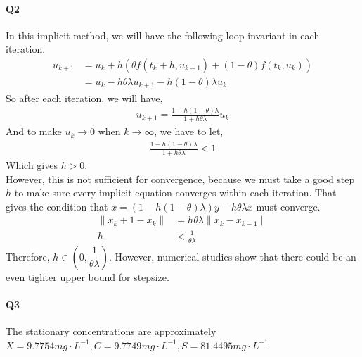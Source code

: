 \documentclass[11pt]{article}
\begin{document}
\paragraph{Q2}
In this implicit method, we will have the following loop invariant in each iteration.
\begin{align}
	u_{k+1}&=u_k+h(\theta f(t_k+h,u_{k+1})+(1-\theta)f(t_k,u_k))\\
	&=u_k-h\theta\lambda u_{k+1}-h(1-\theta)\lambda u_k
\end{align}
So after each iteration, we will have,
\begin{align}
	u_{k+1}=\frac{1-h(1-\theta)\lambda}{1+h\theta\lambda}u_k
\end{align}
And to make $u_k\rightarrow0$ when $k\rightarrow\infty$, we have to let,
\begin{align}
	\frac{1-h(1-\theta)\lambda}{1+h\theta\lambda}<1
\end{align}
Which gives $h>0$.\\
However, this is not sufficient for convergence, because we must take a good step $h$ to make sure every implicit equation converges within each iteration. That gives the condition that $x=(1-h(1-\theta)\lambda)y-h\theta\lambda x$ must converge.
\begin{align}
	\|x_k+1-x_k\|&=h\theta\lambda\|x_k-x_{k-1}\|\\
	h&<\frac{1}{\theta\lambda}
\end{align} 
Therefore, $h\in (0,\dfrac{1}{\theta\lambda})$. However, numerical studies show that there could be an even tighter upper bound for stepsize.
\paragraph{Q3}
The stationary concentrations are approximately $X=9.7754mg\cdot L^{-1}, C=9.7749mg\cdot L^{-1}
,S=81.4495mg\cdot L^{-1}$
\begin{figure}[H]
	\centering
\end{figure}
\end{document}
